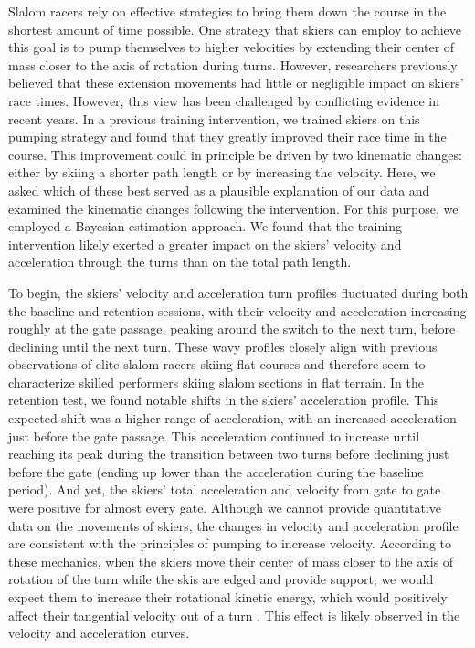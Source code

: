 \documentclass{article}
\begin{document}
Slalom racers rely on effective strategies to bring them down the course in the shortest amount of time possible. One strategy that skiers can employ to achieve this goal is to pump themselves to higher velocities by extending their center of mass closer to the axis of rotation during turns. However, researchers previously believed that these extension movements had little or negligible impact on skiers' race times. However, this view has been challenged by conflicting evidence in recent years. In a previous training intervention, we trained skiers on this pumping strategy and found that they greatly improved their race time in the course. This improvement could in principle be driven by two kinematic changes: either by skiing a shorter path length or by increasing the velocity. Here, we asked which of these best served as a plausible explanation of our data and examined the kinematic changes following the intervention. For this purpose, we employed a Bayesian estimation approach. We found that the training intervention likely exerted a greater impact on the skiers' velocity and acceleration through the turns than on the total path length.

To begin, the skiers' velocity and acceleration turn profiles fluctuated during both the baseline and retention sessions, with their velocity and acceleration increasing roughly at the gate passage, peaking around the switch to the next turn, before declining until the next turn. These wavy profiles closely align with previous observations of elite slalom racers skiing flat courses \cite{supej_impact_2015} and therefore seem to characterize skilled performers skiing slalom sections in flat terrain. In the retention test, we found notable shifts in the skiers' acceleration profile. This expected shift was a higher range of acceleration, with an increased acceleration just before the gate passage. This acceleration continued to increase until reaching its peak during the transition between two turns before declining just before the gate (ending up lower than the acceleration during the baseline period). And yet, the skiers' total acceleration and velocity from gate to gate were positive for almost every gate. Although we cannot provide quantitative data on the movements of skiers, the changes in velocity and acceleration profile are consistent with the principles of pumping to increase velocity. According to these mechanics, when the skiers move their center of mass closer to the axis of rotation of the turn while the skis are edged and provide support, we would expect them to increase their rotational kinetic energy, which would positively affect their tangential velocity out of a turn \cite{lind_physics_2013}. This effect is likely observed in the velocity and acceleration curves.
\end{document}
